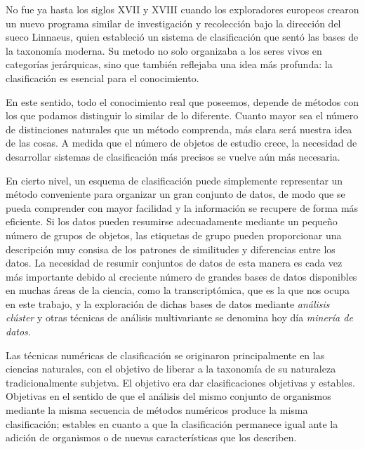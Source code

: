 No fue ya hasta los siglos XVII y XVIII cuando los exploradores europeos crearon un nuevo programa similar de investigación y recolección bajo la dirección del 
sueco Linnaeus, quien estableció un sistema de clasificación que sentó las bases de la taxonomía moderna. Su metodo no solo organizaba a los seres vivos
en categorías jerárquicas, sino que también reflejaba una idea más profunda: la clasificación es esencial para el conocimiento. \newline

En este sentido, todo el conocimiento real que poseemos, depende de métodos con los que podamos distinguir lo similar de lo diferente. Cuanto mayor sea el 
número de distinciones naturales que un método comprenda, más clara será nuestra idea de las cosas. A medida que el número de objetos de estudio crece, la 
necesidad de desarrollar sistemas de clasificación más precisos se vuelve aún más necesaria. \newline

En cierto nivel, un esquema de clasificación puede simplemente representar un método conveniente para organizar un gran conjunto de datos, de modo que se pueda
comprender con mayor facilidad y la información se recupere de forma más eficiente. Si los datos pueden resumirse adecuadamente mediante un pequeño número de grupos
de objetos, las etiquetas de grupo pueden proporcionar una descripción muy consisa de los patrones de similitudes y diferencias entre los datos. La necesidad de 
resumir conjuntos de datos de esta manera es cada vez más importante debido al creciente número de grandes bases de datos disponibles en muchas áreas de la ciencia,
como la transcriptómica, que es la que nos ocupa en este trabajo, y la exploración de dichas bases de datos mediante \textit{análisis clúster} y otras técnicas de 
análisis multivariante se denomina hoy día \textit{minería de datos}. \newline

Las técnicas numéricas de clasificación se originaron principalmente en las ciencias naturales, con el objetivo de liberar a la taxonomía de su naturaleza tradicionalmente
subjetva. El objetivo era dar clasificaciones objetivas y estables. Objetivas en el sentido de que el análisis del mismo conjunto de organismos mediante la misma 
secuencia de métodos numéricos produce la misma clasificación; estables en cuanto a que la clasificación permanece igual ante la adición de organismos o de nuevas
características que los describen. \newline

